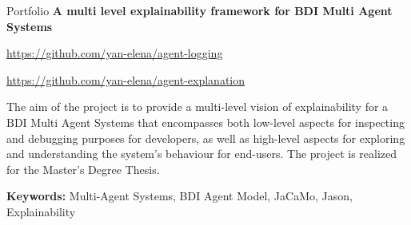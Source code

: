 \begin{rubric}{Portfolio}
\entry*[03/2023 - Today] \textbf{A multi level explainability framework for BDI Multi Agent Systems}
        \par \faGithub \url{https://github.com/yan-elena/agent-logging}
        \par \faGithub \url{https://github.com/yan-elena/agent-explanation}
        \par The aim of the project is to provide a multi-level vision of explainability for a BDI Multi Agent Systems that encompasses both low-level aspects for inspecting and debugging purposes for developers, as well as high-level aspects for exploring and understanding the system's behaviour for end-users. The project is realized for the Master's Degree Thesis.
        \par \textbf{Keywords:} Multi-Agent Systems, BDI Agent Model, JaCaMo, Jason, Explainability
        

\end{rubric}
